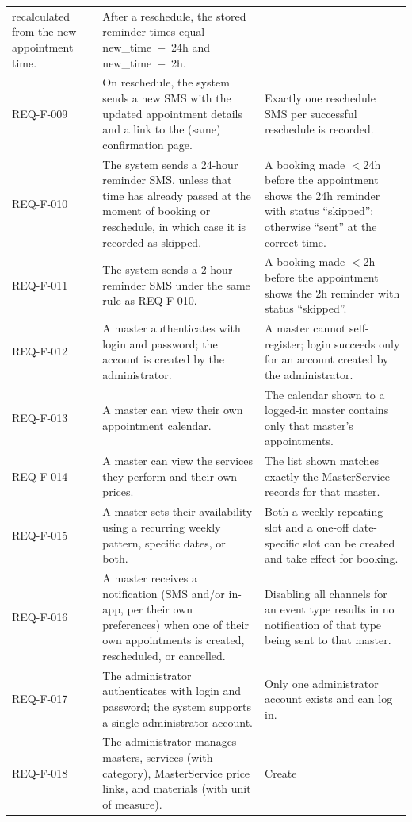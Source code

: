\documentclass[11pt,a4paper]{article}
\begin{document}
\begin{longtable}{L{1.9cm}L{6.4cm}L{6.2cm}}
  recalculated from the new appointment time. & After a reschedule, the
  stored reminder times equal new\_time~$-$~24h and new\_time~$-$~2h. \\
REQ-F-009 & On reschedule, the system sends a new SMS with the updated
  appointment details and a link to the (same) confirmation page. & Exactly
  one reschedule SMS per successful reschedule is recorded. \\
REQ-F-010 & The system sends a 24-hour reminder SMS, unless that time has
  already passed at the moment of booking or reschedule, in which case it
  is recorded as skipped. & A booking made $<$24h before the appointment
  shows the 24h reminder with status ``skipped''; otherwise ``sent'' at the
  correct time. \\
REQ-F-011 & The system sends a 2-hour reminder SMS under the same rule as
  REQ-F-010. & A booking made $<$2h before the appointment shows the 2h
  reminder with status ``skipped''. \\
REQ-F-012 & A master authenticates with login and password; the account is
  created by the administrator. & A master cannot self-register; login
  succeeds only for an account created by the administrator. \\
REQ-F-013 & A master can view their own appointment calendar. & The
  calendar shown to a logged-in master contains only that master's
  appointments. \\
REQ-F-014 & A master can view the services they perform and their own
  prices. & The list shown matches exactly the MasterService records for
  that master. \\
REQ-F-015 & A master sets their availability using a recurring weekly
  pattern, specific dates, or both. & Both a weekly-repeating slot and a
  one-off date-specific slot can be created and take effect for booking. \\
REQ-F-016 & A master receives a notification (SMS and/or in-app, per their
  own preferences) when one of their own appointments is created,
  rescheduled, or cancelled. & Disabling all channels for an event type
  results in no notification of that type being sent to that master. \\
REQ-F-017 & The administrator authenticates with login and password; the
  system supports a single administrator account. & Only one administrator
  account exists and can log in. \\
REQ-F-018 & The administrator manages masters, services (with category),
  MasterService price links, and materials (with unit of measure). & Create

\end{longtable}
\end{document}
